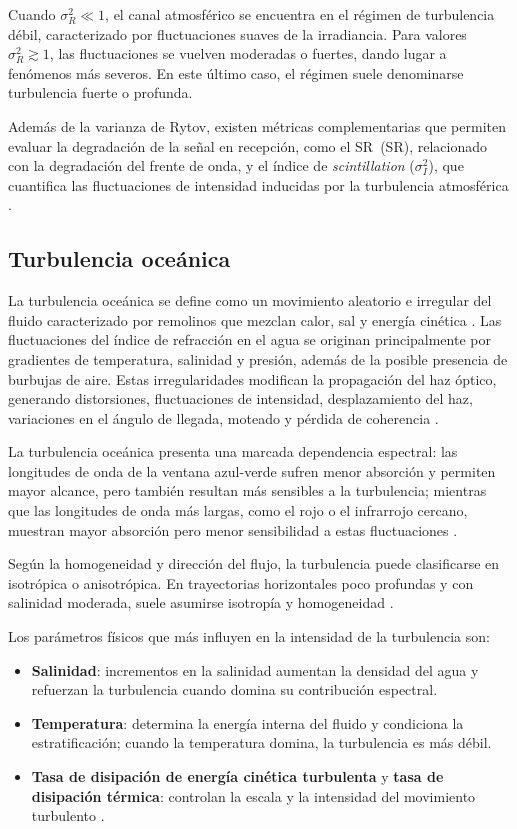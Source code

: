 Cuando $\sigma_R^2 \ll 1$, el canal atmosférico se encuentra en el régimen de turbulencia débil, caracterizado por fluctuaciones suaves de la irradiancia. Para valores $\sigma_R^2 \gtrsim 1$, las fluctuaciones se vuelven moderadas o fuertes, dando lugar a fenómenos más severos. En este último caso, el régimen suele denominarse turbulencia fuerte o profunda.\cite{Phillips}

Además de la varianza de Rytov, existen métricas complementarias que permiten evaluar la degradación de la señal en recepción, como el \acs{SR}~(\acl{SR}), relacionado con la degradación del frente de onda, y el índice de \textit{scintillation} ($\sigma_I^2$), que cuantifica las fluctuaciones de intensidad inducidas por la turbulencia atmosférica \cite{Trichili}.


\subsection{Turbulencia oceánica}
La turbulencia oceánica se define como un movimiento aleatorio e irregular del fluido caracterizado por remolinos que mezclan calor, sal y energía cinética \cite{Sun}. Las fluctuaciones del índice de refracción en el agua se originan principalmente por gradientes de temperatura, salinidad y presión, además de la posible presencia de burbujas de aire. Estas irregularidades modifican la propagación del haz óptico, generando distorsiones, fluctuaciones de intensidad, desplazamiento del haz, variaciones en el ángulo de llegada, moteado y pérdida de coherencia \cite{Baykal}.

La turbulencia oceánica presenta una marcada dependencia espectral: las longitudes de onda de la ventana azul-verde sufren menor absorción y permiten mayor alcance, pero también resultan más sensibles a la turbulencia; mientras que las longitudes de onda más largas, como el rojo o el infrarrojo cercano, muestran mayor absorción pero menor sensibilidad a estas fluctuaciones \cite{Sun}.

Según la homogeneidad y dirección del flujo, la turbulencia puede clasificarse en isotrópica o anisotrópica. En trayectorias horizontales poco profundas y con salinidad moderada, suele asumirse isotropía y homogeneidad \cite{Ata}. 

Los parámetros físicos que más influyen en la intensidad de la turbulencia son:

\begin{itemize}
    \item \textbf{Salinidad}: incrementos en la salinidad aumentan la densidad del agua y refuerzan la turbulencia cuando domina su contribución espectral.
    \item \textbf{Temperatura}: determina la energía interna del fluido y condiciona la estratificación; cuando la temperatura domina, la turbulencia es más débil\cite{Thorpe,Thorpe2}.
    \item \textbf{Tasa de disipación de energía cinética turbulenta} y 
    \textbf{tasa de disipación térmica}: controlan la escala y la intensidad del movimiento turbulento \cite{Woods,Matt}.
\end{itemize}

